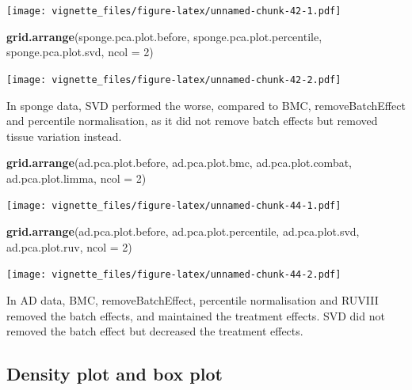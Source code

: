 \documentclass[]{book}
\newenvironment{Shaded}{\begin{snugshade}}{\end{snugshade}}
\newcommand{\KeywordTok}[1]{\textcolor[rgb]{0.13,0.29,0.53}{\textbf{#1}}}
\newcommand{\DataTypeTok}[1]{\textcolor[rgb]{0.13,0.29,0.53}{#1}}
\newcommand{\DecValTok}[1]{\textcolor[rgb]{0.00,0.00,0.81}{#1}}
\newcommand{\NormalTok}[1]{#1}
\begin{document}
\texttt{[image: vignette\_files/figure-latex/unnamed-chunk-42-1.pdf]}

\begin{Shaded}
\begin{Highlighting}[]
\KeywordTok{grid.arrange}\NormalTok{(sponge.pca.plot.before, sponge.pca.plot.percentile, }
\NormalTok{             sponge.pca.plot.svd, }\DataTypeTok{ncol =} \DecValTok{2}\NormalTok{)}
\end{Highlighting}
\end{Shaded}

\texttt{[image: vignette\_files/figure-latex/unnamed-chunk-42-2.pdf]}

In sponge data, SVD performed the worse, compared to BMC,
removeBatchEffect and percentile normalisation, as it did not remove
batch effects but removed tissue variation instead.

\begin{Shaded}
\begin{Highlighting}[]
\KeywordTok{grid.arrange}\NormalTok{(ad.pca.plot.before, ad.pca.plot.bmc, }
\NormalTok{             ad.pca.plot.combat, ad.pca.plot.limma, }\DataTypeTok{ncol =} \DecValTok{2}\NormalTok{)}
\end{Highlighting}
\end{Shaded}

\texttt{[image: vignette\_files/figure-latex/unnamed-chunk-44-1.pdf]}

\begin{Shaded}
\begin{Highlighting}[]
\KeywordTok{grid.arrange}\NormalTok{(ad.pca.plot.before, ad.pca.plot.percentile, }
\NormalTok{             ad.pca.plot.svd, ad.pca.plot.ruv, }\DataTypeTok{ncol =} \DecValTok{2}\NormalTok{)}
\end{Highlighting}
\end{Shaded}

\texttt{[image: vignette\_files/figure-latex/unnamed-chunk-44-2.pdf]}

In AD data, BMC, removeBatchEffect, percentile normalisation and RUVIII
removed the batch effects, and maintained the treatment effects. SVD did
not removed the batch effect but decreased the treatment effects.

\subsection{Density plot and box
plot}\label{density-plot-and-box-plot-1}
\end{document}
